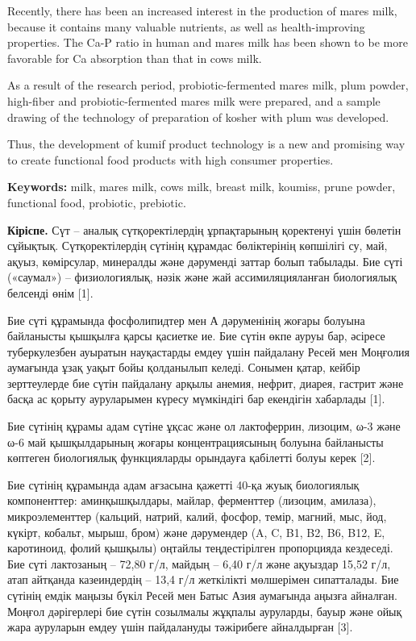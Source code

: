 Recently, there has been an increased interest in the production of
mare\textquotesingle s milk, because it contains many valuable
nutrients, as well as health-improving properties. The Ca-P ratio in
human and mare\textquotesingle s milk has been shown to be more
favorable for Ca absorption than that in cow\textquotesingle s milk.

As a result of the research period, probiotic-fermented
mare\textquotesingle s milk, plum powder, high-fiber and
probiotic-fermented mare\textquotesingle s milk were prepared, and a
sample drawing of the technology of preparation of kosher with plum was
developed.

Thus, the development of kumif product technology is a new and promising
way to create functional food products with high consumer properties.

{\bfseries Keywords:} milk, mare\textquotesingle s milk,
cow\textquotesingle s milk, breast milk, koumiss, prune powder,
functional food, probiotic, prebiotic.

{\bfseries Кіріспе.} Сүт -- аналық сүтқоректілердің ұрпақтарының қоректенуі
үшін бөлетін сұйықтық. Сүтқоректілердің сүтінің құрамдас бөліктерінің
көпшілігі су, май, ақуыз, көмірсулар, минералды және дәруменді заттар
болып табылады. Бие сүті («саумал») -- физиологиялық, нәзік және жай
ассимиляцияланған биологиялық белсенді өнім {[}1{]}.

Бие сүті құрамында фосфолипидтер мен А дәруменінің жоғары болуына
байланысты қышқылға қарсы қасиетке ие. Бие сүтін өкпе ауруы бар, әсіресе
туберкулезбен ауыратын науқастарды емдеу үшін пайдалану Ресей мен
Моңғолия аумағында ұзақ уақыт бойы қолданылып келеді. Сонымен қатар,
кейбір зерттеулерде бие сүтін пайдалану арқылы анемия, нефрит, диарея,
гастрит және басқа ас қорыту ауруларымен күресу мүмкіндігі бар екендігін
хабарлады {[}1{]}.

Бие сүтінің құрамы адам сүтіне ұқсас және ол лактоферрин, лизоцим, ω-3
және ω-6 май қышқылдарының жоғары концентрациясының болуына байланысты
көптеген биологиялық функцияларды орындауға қабілетті болуы керек
{[}2{]}.

Бие сүтінің құрамында адам ағзасына қажетті 40-қа жуық биологиялық
компоненттер: аминқышқылдары, майлар, ферменттер (лизоцим, амилаза),
микроэлементтер (кальций, натрий, калий, фосфор, темір, магний, мыс,
йод, күкірт, кобальт, мырыш, бром) және дәрумендер (A, C, B1, B2, B6,
B12, E, каротиноид, фолий қышқылы) оңтайлы теңдестірілген пропорцияда
кездеседі. Бие сүті лактозаның -- 72,80 г/л, майдың -- 6,40 г/л және
ақуыздар 15,52 г/л, атап айтқанда казеиндердің -- 13,4 г/л жеткілікті
мөлшерімен сипатталады. Бие сүтінің емдік маңызы бүкіл Ресей мен Батыс
Азия аумағында аңызға айналған. Моңғол дәрігерлері бие сүтін созылмалы
жұқпалы ауруларды, бауыр және ойық жара ауруларын емдеу үшін пайдалануды
тәжірибеге айналдырған {[}3{]}.


